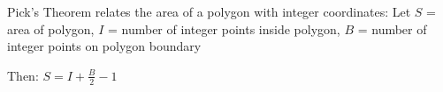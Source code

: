 Pick's Theorem relates the area of a polygon with integer coordinates: Let $S$ = area of polygon, $I$ = number of integer points inside polygon, $B$ = number of integer points on polygon boundary

Then: $S = I + \frac{B}{2} - 1$
